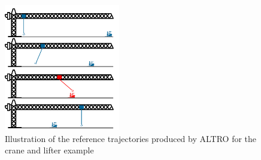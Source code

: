\begin{figure}[t]\label{fig:cr_and_lft}
	\centering
	\includegraphics[width=0.45\textwidth]{figures/crane_and_lifter.png}
	\caption{Illustration of the reference trajectories produced by ALTRO for the crane and lifter example}
\end{figure}


